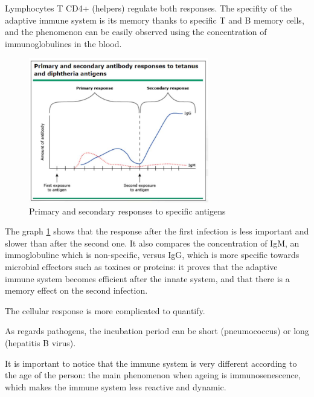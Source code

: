 \documentclass{article}
\begin{document}
\begin{itemize}
                        Lymphocytes T CD4+ (helpers) regulate both responses.
                        The specifity of the adaptive immune system is its memory thanks to specific T and B memory cells, 
                            and the phenomenon can be easily observed using the concentration of immunoglobulines in the blood.
                        
                            \begin{figure}
                                \centering
                                \includegraphics[width=0.7\textwidth]{imgs/PrimarySecondaryResponses.JPG}
                                \caption{Primary and secondary responses to specific antigens \autocite{pinkComparisonImmunityGeneral}}
                                \label{fig:responses}
                            \end{figure}

                        The graph \ref{fig:responses} shows that the response after the first infection is less important and slower than after the second one.
                        It also compares the concentration of IgM, an immoglobuline which is non-specific, 
                            versus IgG, which is more specific towards microbial effectors such as toxines or proteins:
                            it proves that the adaptive immune system becomes efficient after the innate system, and that there is a memory effect on the second infection.                     

                        The cellular response is more complicated to quantify.

                        As regards pathogens, the incubation period can be short (pneumococcus) or long (hepatitis B virus).

                        It is important to notice that the immune system is very different according to the age of the person: the main phenomenon when ageing is immunosenescence,
                            which makes the immune system less reactive and dynamic.
                \end{itemize}
              
\end{document}
